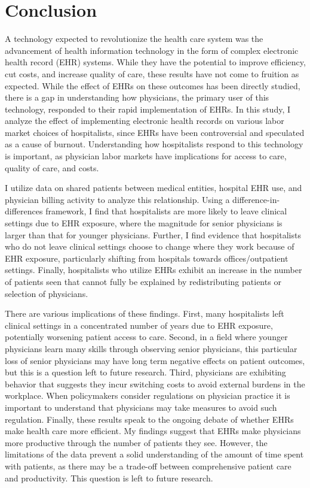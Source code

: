 \documentclass[12pt]{article}
\begin{document}
\section{Conclusion}

A technology expected to revolutionize the health care system was the advancement of health information technology in the form of complex electronic health record (EHR) systems. While they have the potential to improve efficiency, cut costs, and increase quality of care, these results have not come to fruition as expected. While the effect of EHRs on these outcomes has been directly studied, there is a gap in understanding how physicians, the primary user of this technology, responded to their rapid implementation of EHRs. In this study, I analyze the effect of implementing electronic health records on various labor market choices of hospitalists, since EHRs have been controversial and speculated as a cause of burnout. Understanding how hospitalists respond to this technology is important, as physician labor markets have implications for access to care, quality of care, and costs. 

I utilize data on shared patients between medical entities, hospital EHR use, and physician billing activity to analyze this relationship. Using a difference-in-differences framework, I find that hospitalists are more likely to leave clinical settings due to EHR exposure, where the magnitude for senior physicians is larger than that for younger physicians. Further, I find evidence that hospitalists who do not leave clinical settings choose to change where they work because of EHR exposure, particularly shifting from hospitals towards offices/outpatient settings. Finally, hospitalists who utilize EHRs exhibit an increase in the number of patients seen that cannot fully be explained by redistributing patients or selection of physicians. 

There are various implications of these findings. First, many hospitalists left clinical settings in a concentrated number of years due to EHR exposure, potentially worsening patient access to care. Second, in a field where younger physicians learn many skills through observing senior physicians, this particular loss of senior physicians may have long term negative effects on patient outcomes, but this is a question left to future research. Third, physicians are exhibiting behavior that suggests they incur switching costs to avoid external burdens in the workplace. When policymakers consider regulations on physician practice it is important to understand that physicians may take measures to avoid such regulation. Finally, these results speak to the ongoing debate of whether EHRs make health care more efficient. My findings suggest that EHRs make physicians more productive through the number of patients they see. However, the limitations of the data prevent a solid understanding of the amount of time spent with patients, as there may be a trade-off between comprehensive patient care and productivity. This question is left to future research.  
 
\end{document}
